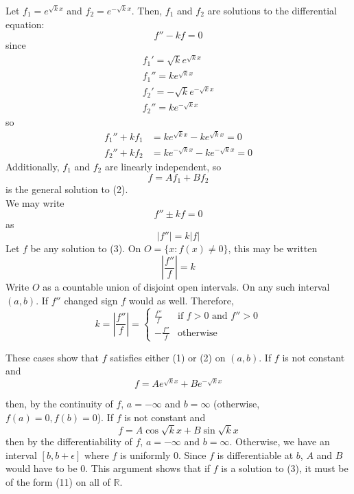 \documentclass[12pt]{amsart}
\theoremstyle{definition}
\theoremstyle{remark}
\begin{document}
\begin{itemize}
\begin{itemize}
Let $f_1=e^{\sqrt{k}x}$ and $f_{2}=e^{-\sqrt{k}x}$. Then, $f_{1}$ and $f_2$ are solutions to the differential equation:
\begin{equation}f''-kf=0\end{equation}since \begin{align*}
f_{1}'=\sqrt{k}e^{\sqrt{k}x}\\
f_{1}''=ke^{\sqrt{k}x}\\
f_{2}'=-\sqrt{k}e^{-\sqrt{k}x}\\
f_{2}''=ke^{-\sqrt{k}x}
\end{align*}so\begin{align*}
f_{1}''+kf_1&=ke^{\sqrt{k}x}-ke^{\sqrt{k}x}=0\\
f_{2}''+kf_{2}&=ke^{-\sqrt{k}x}-ke^{-\sqrt{k}x}=0
\end{align*}Additionally, $f_1$ and $f_2$ are linearly independent, so $$f=Af_{1}+Bf_{2}$$is the general solution to (2).
\\

We may write \begin{equation}f''\pm k f=0\end{equation}as $$|f''|=k|f|$$Let $f$ be any solution to (3). On $O=\{x:f(x)\ne0\}$, this may be written $$\left|\frac{f''}{f}\right|=k$$Write $O$ as a countable union of disjoint open intervals. On any such interval $(a,b)$. If $f''$ changed sign $f$ would as well. Therefore, $$k=\left| \frac{f''}{f}\right|= \begin{cases}\frac{f''}{f} & \text{if }f>0\text{ and }f''>0 \\
  - \frac{f''}{f} & \text{otherwise}\end{cases}$$
  
  These cases show that $f$ satisfies either (1) or (2) on $(a,b)$. If $f$ is not constant and $$f=Ae^{\sqrt{k}x}+Be^{-\sqrt{k}x}$$
  
  then, by the continuity of $f$, $a=-\infty$ and $b=\infty$ (otherwise, $f(a)=0,f(b)=0$). If $f$ is not constant and $$f=A\cos\sqrt{k}x+B\sin\sqrt{k}x$$then by the differentiability of $f$, $a=-\infty$ and $b=\infty$. Otherwise, we have an interval $[b,b+\epsilon]$ where $f$ is uniformly 0. Since $f$ is differentiable at $b$, $A$ and $B$ would have to be 0. This argument shows that if $f$ is a solution to (3), it must be of the form (11) on all of $\mathbb{R}$.

\end{itemize}

\vspace{0.2 cm}


\end{itemize}
\end{document}
